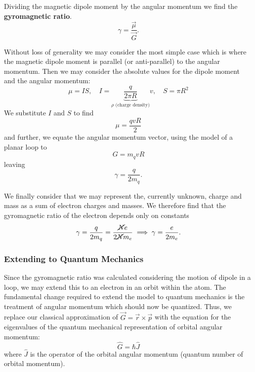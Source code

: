 Dividing the magnetic dipole moment by the angular momentum we find the \textbf{gyromagnetic ratio}. 
\begin{equation}
    \gamma = \frac{\vec{\mu}}{\vec{G}}.
    \label{eq:gyromagnetic_ratio}
\end{equation}

Without loss of generality we may consider the most simple case which is where the magnetic dipole moment is parallel (or anti-parallel) to the angular momentum. Then we may consider the absolute values for the dipole moment and the angular momentum: 
\begin{equation}
    \mu = IS, \quad I = \underbrace{\frac{q}{2\pi R}}_{\rho \text{ (charge density)}}v, \quad S = \pi R^2 
\end{equation}
We substitute $I$ and $S$ to find 
\begin{equation}
    \mu = \frac{qvR}{2} 
\end{equation}
and further, we equate the angular momentum vector, using the model of a planar loop to 
\begin{equation}
   G= m_q v R 
\end{equation}
leaving 
\begin{equation}
    \gamma = \frac{q}{2m_q } . 
\end{equation}

We finally consider that we may represent the, currently unknown, charge and mass as a sum of electron charges and masses. We therefore find that the gyromagnetic ratio of the electron depends only on constants 
\begin{equation}
    \gamma = \frac{q}{2m_q } = \frac{\cancel{N}e}{2\cancel{N} m_e} \implies \gamma = \frac{e}{2 m_e}.
\end{equation}


\cite{bromley2000quantum}


\subsubsection{Extending to Quantum Mechanics}
Since the gyromagnetic ratio was calculated considering the motion of dipole in a loop, we may extend this to an electron in an orbit within the atom. The fundamental change required to extend the model to quantum mechanics is the treatment of angular momentum which should now be quantized. 
Thus, we replace our classical approximation of $\vec{G} = \vec{r} \times \vec{p}$ with the equation for the eigenvalues of the quantum mechanical representation of orbital angular momentum:
\begin{equation}
    \hat{G} = \hbar \hat{J} 
\end{equation}
where $\hat{J}$ is the operator of the orbital angular momentum (quantum number of orbital momentum). 

